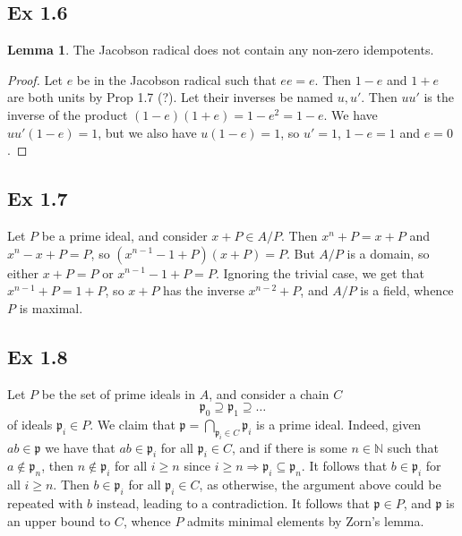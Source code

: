 \documentclass{article}
\theoremstyle{definition}
\newtheorem{lemma}[theorem]{Lemma}
\newcommand{\N}{\mathbb{N}}
\begin{document}
\subsection*{Ex 1.6}

\begin{lemma}
	The Jacobson radical does not contain any non-zero idempotents.
\end{lemma}
\begin{proof}
	Let $e$ be in the Jacobson radical such that $ee = e$. Then $1 - e$ and $1 + e$
	are both units by Prop 1.7 (?). Let their inverses be named $u, u'$. Then $uu'$
	is the inverse of the product $(1 - e)(1 + e) = 1 - e^2 = 1 - e$. We have
	$uu'(1 - e) = 1$, but we also have $u(1 - e) = 1$, so $u' = 1$, $1 - e = 1$ and
	$e = 0$.
\end{proof}

\subsection*{Ex 1.7}
Let $P$ be a prime ideal, and consider $x + P \in A / P$. Then $x^n + P = x +
	P$ and $x^n - x + P = P$, so $(x^{n-1} - 1 + P)(x + P) = P$. But $A/P$ is a
domain, so either $x + P = P$ or $x^{n-1} - 1 + P = P$. Ignoring the trivial
case, we get that $x^{n-1} + P = 1 + P$, so $x + P$ has the inverse $x^{n - 2}
	+ P$, and $A/P$ is a field, whence $P$ is maximal.

\subsection*{Ex 1.8}
Let $P$ be the set of prime ideals in $A$, and consider a chain $C$
\[
	\mathfrak{p}_{0} \supseteq  
	\mathfrak{p}_{1} \supseteq  
	\ldots
\] 
of ideals $\mathfrak{p}_{i} \in P$. We claim that $\mathfrak{p} =
\bigcap_{\mathfrak{p}_i \in C} \mathfrak{p}_i$ is a prime ideal. Indeed, given
$ab \in \mathfrak{p}$ we have that $ab \in \mathfrak{p}_i$ for all
$\mathfrak{p}_i \in C$, and if there is some $n \in \N$ such that $a \not \in
\mathfrak{p}_n$, then $n \not \in \mathfrak{p}_i$ for all $i \geq n$ since $i
\geq n \Rightarrow \mathfrak{p}_i \subseteq \mathfrak{p}_{n}$. It follows that
$b \in \mathfrak{p}_i$ for all $i \geq n$. Then $b \in \mathfrak{p}_i$ for all
$\mathfrak{p}_i \in C$, as otherwise, the argument above could be repeated with
$b$ instead, leading to a contradiction. It follows that $\mathfrak{p} \in P$,
and $\mathfrak{p}$ is an upper bound to $C$, whence $P$ admits minimal elements
by Zorn's lemma.
\end{document}
